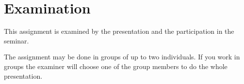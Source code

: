 \documentclass[a4paper]{article}
\begin{document}
\section{Examination}%
\label{sec:Examination}

This assignment is examined by the presentation and the participation in the 
seminar.

The assignment may be done in groups of up to two individuals.
If you work in groups the examiner will choose one of the group members to do 
the whole presentation.


\printbibliography{}
\end{document}
